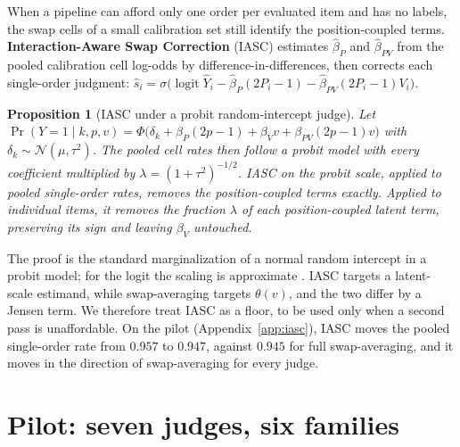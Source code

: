 \documentclass[10pt]{article}
\newtheorem{proposition}{Proposition}
\theoremstyle{remark}
\newcommand{\logit}{\operatorname{logit}}
\begin{document}
When a pipeline can afford only one order per evaluated item and has no
labels, the swap cells of a small calibration set still identify the
position-coupled terms. \textbf{Interaction-Aware Swap Correction}
(IASC) estimates $\hat\beta_P$ and $\hat\beta_{PV}$ from the pooled
calibration cell log-odds by difference-in-differences, then corrects
each single-order judgment:
$\hat s_i=\sigma\bigl(\logit\hat Y_i-\hat\beta_P(2P_i-1)-\hat\beta_{PV}(2P_i-1)V_i\bigr)$.

\begin{proposition}[IASC under a probit random-intercept judge]
\label{prop:iasc}
Let $\Pr(Y=1\mid k,p,v)=\Phi\bigl(\delta_k+\beta_P(2p-1)+\beta_V v+\beta_{PV}(2p-1)v\bigr)$
with $\delta_k\sim\mathcal N(\mu,\tau^2)$. The pooled cell rates then
follow a probit model with every coefficient multiplied by
$\lambda=(1+\tau^2)^{-1/2}$. IASC on the probit scale, applied to pooled
single-order rates, removes the position-coupled terms exactly. Applied
to individual items, it removes the fraction $\lambda$ of each
position-coupled latent term, preserving its sign and leaving $\beta_V$
untouched.
\end{proposition}

\noindent The proof is the standard marginalization of a normal random
intercept in a probit model; for the logit the scaling is approximate
\citep{zeger1988gee}. IASC targets a latent-scale estimand, while
swap-averaging targets $\theta(v)$, and the two differ by a Jensen term.
We therefore treat IASC as a floor, to be used only when a second pass
is unaffordable. On the pilot (Appendix~\ref{app:iasc}), IASC moves the
pooled single-order rate from $0.957$ to $0.947$, against $0.945$ for
full swap-averaging, and it moves in the direction of swap-averaging for
every judge.

\section{Pilot: seven judges, six families}
\label{sec:pilot}
\end{document}
